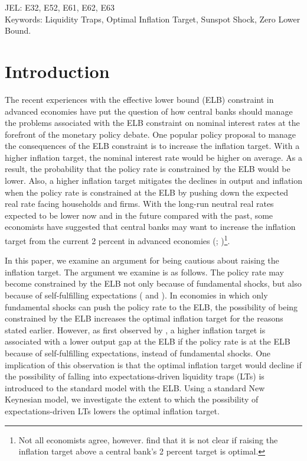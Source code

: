 \documentclass[11pt]{article}
\begin{document}
	\vspace{5em}
	
	\noindent JEL: E32, E52, E61, E62, E63\\
	
	\noindent Keywords: Liquidity Traps, Optimal Inflation Target, Sunspot Shock, Zero Lower Bound.
	
	\newpage
	
	\section{Introduction}
	\label{S:Introduction}
	
	The recent experiences with the effective lower bound (ELB) constraint in advanced economies have put the question of how central banks should manage the problems associated with the ELB constraint on nominal interest rates at the forefront of the monetary policy debate. One popular policy proposal to manage the consequences of the ELB constraint is to increase the inflation target. With a higher inflation target, the nominal interest rate would be higher on average. As a result, the probability that the policy rate is constrained by the ELB would be lower. Also, a higher inflation target mitigates the declines in output and inflation when the policy rate is constrained at the ELB by pushing down the expected real rate facing households and firms. With the long-run neutral real rates expected to be lower now and in the future compared with the past, some economists have suggested that central banks may want to increase the inflation target from the current 2 percent in advanced economies (\citet{Ball2013}; \citet{BlanchardDellAricciaMauro2010})\footnote{Not all economists agree, however. \citet{CoibionGorodnichenkoWieland2012} find that it is not clear if raising the inflation target above a central bank's 2 percent target is optimal.}.
	
	In this paper, we examine an argument for being cautious about raising the inflation target. The argument we examine is as follows. The policy rate may become constrained by the ELB not only because of fundamental shocks, but also because of self-fulfilling expectations (\citet{BenhabibSchmittGroheUribe2001} and \citet{Bullard2010}). In economies in which only fundamental shocks can push the policy rate to the ELB, the possibility of being constrained by the ELB increases the optimal inflation target for the reasons stated earlier. However, as first observed by \citet{MertensRavn2014}, a higher inflation target is associated with a lower output gap at the ELB if the policy rate is at the ELB because of self-fulfilling expectations, instead of fundamental shocks. One implication of this observation is that the optimal inflation target would decline if the possibility of falling into expectations-driven liquidity traps (LTs) is introduced to the standard model with the ELB. Using a standard New Keynesian model, we investigate the extent to which the possibility of expectations-driven LTs lowers the optimal inflation target. 
	
\end{document}
